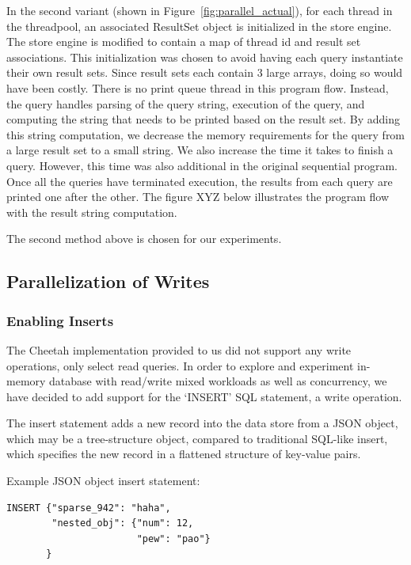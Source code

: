 \documentclass[11pt,journal,compsoc]{IEEEtran}
\begin{document}
In the second variant (shown in Figure~\ref{fig:parallel_actual}), for each thread in the threadpool, an associated ResultSet object is initialized in the store engine. The store engine is modified to contain a map of thread id and result set associations. This initialization was chosen to avoid having each query instantiate their own result sets. Since result sets each contain 3 large arrays, doing so would have been costly. There is no print queue thread in this program flow. Instead, the query handles parsing of the query string, execution of the query, and computing the string that needs to be printed based on the result set. By adding this string computation, we decrease the memory requirements for the query from a large result set to a small string. We also increase the time it takes to finish a query. However, this time was also additional in the original sequential program. Once all the queries have terminated execution, the results from each query are printed one after the other. The figure XYZ below illustrates the program flow with the result string computation.

The second method above is chosen for our experiments.

\subsection{Parallelization of Writes}
\subsubsection{Enabling Inserts}


The Cheetah implementation provided to us did not support any write operations, only select read queries. In order to explore and experiment in-memory database with read/write mixed workloads as well as concurrency, we have decided to add support for the ‘INSERT’ SQL statement, a write operation.
 
The insert statement adds a new record into the data store from a JSON object, which may be a tree-structure object, compared to traditional SQL-like insert, which specifies the new record in a flattened structure of key-value pairs.

Example JSON object insert statement:

\begin{verbatim}
INSERT {"sparse_942": "haha",
        "nested_obj": {"num": 12, 
                       "pew": "pao"}
       }
\end{verbatim}
\end{document}
